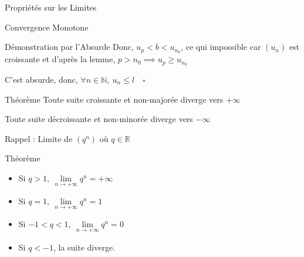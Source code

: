 \documentclass{cours}
\begin{document}
\begin{Gpartie}{Propriétés sur les Limites}
\begin{Spartie}{Convergence Monotone}
\begin{SSpartie}{Démonstration par l'Absurde}
                Donc, $u_p<b<u_{n_0}$, ce qui impossible car $(u_n)$ est croissante et d'après la lemme, $p>n_0\implies u_p\geq u_{n_0}$

                C'est absurde, donc, $\forall n\in\mathbb{N},\ u_n\leq l\quad\square$
            \end{SSpartie}
            \begin{SSpartie}{Théorème} 
                Toute suite croissante et non-majorée diverge vers $+\infty$

                Toute suite décroissante et non-minorée diverge vers $-\infty$
            \end{SSpartie}
        \end{Spartie}
        \begin{Spartie}{Rappel : Limite de $\left(q^n\right)$ où $q\in\mathbb{R}$} 
            \begin{SSpartie}{Théorème} 
                \begin{itemize}
                    \setlength\itemsep{0.5em}
                    \item Si $q>1,\ \lim\limits_{n\to +\infty}q^n=+\infty$
                    \item Si $q=1,\ \lim\limits_{n\to +\infty}q^n=1$
                    \item Si $-1<q<1,\ \lim\limits_{n\to +\infty}q^n=0$
                    \item Si $q<-1$, la suite diverge.
                \end{itemize}
            \end{SSpartie}
        \end{Spartie}
    \end{Gpartie}
\end{document}
